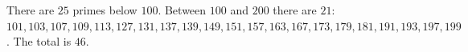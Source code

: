 There are $25$ primes below $100$. Between $100$ and $200$ there are $21$: $101,103,107,109,113,127,131,137,139,149,151,157,163,167,173,179,181,191,193,197,199$. The total is $\boxed{46}$.
